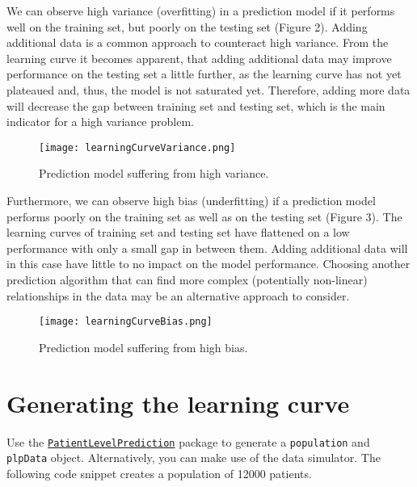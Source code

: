 \documentclass[]{article}
\begin{document}
We can observe high variance (overfitting) in a prediction model if it
performs well on the training set, but poorly on the testing set (Figure
2). Adding additional data is a common approach to counteract high
variance. From the learning curve it becomes apparent, that adding
additional data may improve performance on the testing set a little
further, as the learning curve has not yet plateaued and, thus, the
model is not saturated yet. Therefore, adding more data will decrease
the gap between training set and testing set, which is the main
indicator for a high variance problem.

\begin{figure}
\centering
\texttt{[image: learningCurveVariance.png]}
\caption{Prediction model suffering from high variance.}
\end{figure}

Furthermore, we can observe high bias (underfitting) if a prediction
model performs poorly on the training set as well as on the testing set
(Figure 3). The learning curves of training set and testing set have
flattened on a low performance with only a small gap in between them.
Adding additional data will in this case have little to no impact on the
model performance. Choosing another prediction algorithm that can find
more complex (potentially non-linear) relationships in the data may be
an alternative approach to consider.

\begin{figure}
\centering
\texttt{[image: learningCurveBias.png]}
\caption{Prediction model suffering from high bias.}
\end{figure}

\section{Generating the learning
curve}\label{generating-the-learning-curve}

Use the
\href{http://github.com/OHDSI/PatientLevelPrediction}{\texttt{PatientLevelPrediction}}
package to generate a \texttt{population} and \texttt{plpData} object.
Alternatively, you can make use of the data simulator. The following
code snippet creates a population of 12000 patients.
\end{document}
